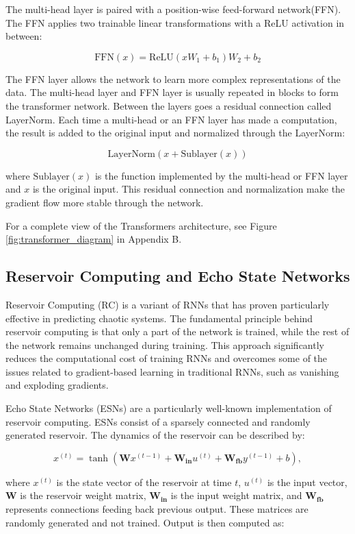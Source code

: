 \documentclass[11pt]{article}
\begin{document}
The multi-head layer is paired with a position-wise feed-forward network(FFN). The FFN applies two trainable linear transformations with a ReLU activation in between:

$$\text{FFN}(x) = \text{ReLU}(xW_1 + b_1)W_2 + b_2$$

The FFN layer allows the network to learn more complex representations of the data. The multi-head layer and FFN layer is usually repeated in blocks to form the transformer network. Between the layers goes a residual connection called LayerNorm. Each time a multi-head or an FFN layer has made a computation, the result is added to the original input and normalized through the LayerNorm:

$$\text{LayerNorm}(x + \text{Sublayer}(x))$$

where $\text{Sublayer}(x)$ is the function implemented by the multi-head or FFN layer and $x$ is the original input. This residual connection and normalization make the gradient flow more stable through the network. 

For a complete view of the Transformers architecture, see Figure \ref{fig:transformer_diagram} in Appendix B.

\subsection{Reservoir Computing and Echo State Networks}

Reservoir Computing (RC) is a variant of RNNs that has proven particularly effective in predicting chaotic systems. The fundamental principle behind reservoir computing is that only a part of the network is trained, while the rest of the network remains unchanged during training. This approach significantly reduces the computational cost of training RNNs and overcomes some of the issues related to gradient-based learning in traditional RNNs, such as vanishing and exploding gradients.

Echo State Networks (ESNs) are a particularly well-known implementation of reservoir computing. ESNs consist of a sparsely connected and randomly generated reservoir. The dynamics of the reservoir can be described by:

\begin{equation}
x^{(t)} = \tanh(\mathbf{W}x^{(t-1)} + \mathbf{W_{in}}u^{(t)} + \mathbf{W_{fb}}y^{(t-1)} + b),
\end{equation}

where $x^{(t)}$ is the state vector of the reservoir at time $t$, $u^{(t)}$ is the input vector, $\mathbf{W}$ is the reservoir weight matrix, $\mathbf{W_{in}}$ is the input weight matrix, and $\mathbf{W_{fb}}$ represents connections feeding back previous output. These matrices are randomly generated and not trained. Output is then computed as:
\end{document}
